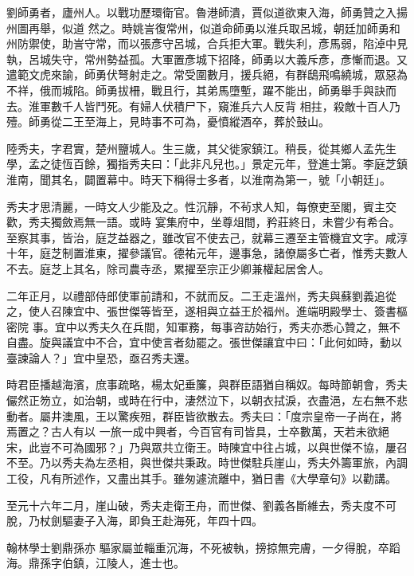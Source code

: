 \begin{pinyinscope}
 劉師勇者，廬州人。以戰功歷環衛官。魯港師潰，賈似道欲東入海，師勇贊之入揚州圖再舉，似道
 然之。時姚訔復常州，似道命師勇以淮兵取呂城，朝廷加師勇和州防禦使，助訔守常，而以張彥守呂城，合兵拒大軍。戰失利，彥馬弱，陷淖中見執，呂城失守，常州勢益孤。大軍置彥城下招降，師勇以大義斥彥，彥慚而退。又遣範文虎來諭，師勇伏弩射走之。常受圍數月，援兵絕，有群鴟飛鳴繞城，眾惡為不祥，俄而城陷。師勇拔柵，戰且行，其弟馬墮塹，躍不能出，師勇舉手與訣而去。淮軍數千人皆鬥死。有婦人伏積尸下，窺淮兵六人反背
 相拄，殺敵十百人乃殪。師勇從二王至海上，見時事不可為，憂憤縱酒卒，葬於鼓山。



 陸秀夫，字君實，楚州鹽城人。生三歲，其父徙家鎮江。稍長，從其鄉人孟先生學，孟之徒恆百餘，獨指秀夫曰：「此非凡兒也。」景定元年，登進士第。李庭芝鎮淮南，聞其名，闢置幕中。時天下稱得士多者，以淮南為第一，號「小朝廷」。



 秀夫才思清麗，一時文人少能及之。性沉靜，不茍求人知，每僚吏至閣，賓主交歡，秀夫獨斂焉無一語。或時
 宴集府中，坐尊俎間，矜莊終日，未嘗少有希合。至察其事，皆治，庭芝益器之，雖改官不使去己，就幕三遷至主管機宜文字。咸淳十年，庭芝制置淮東，擢參議官。德祐元年，邊事急，諸僚屬多亡者，惟秀夫數人不去。庭芝上其名，除司農寺丞，累擢至宗正少卿兼權起居舍人。



 二年正月，以禮部侍郎使軍前請和，不就而反。二王走溫州，秀夫與蘇劉義追從之，使人召陳宜中、張世傑等皆至，遂相與立益王於福州。進端明殿學士、簽書樞密院
 事。宜中以秀夫久在兵間，知軍務，每事咨訪始行，秀夫亦悉心贊之，無不自盡。旋與議宜中不合，宜中使言者劾罷之。張世傑讓宜中曰：「此何如時，動以臺諫論人？」宜中皇恐，亟召秀夫還。



 時君臣播越海濱，庶事疏略，楊太妃垂簾，與群臣語猶自稱奴。每時節朝會，秀夫儼然正笏立，如治朝，或時在行中，淒然泣下，以朝衣拭淚，衣盡浥，左右無不悲動者。屬井澳風，王以驚疾殂，群臣皆欲散去。秀夫曰：「度宗皇帝一子尚在，將焉置之？古人有以
 一旅一成中興者，今百官有司皆具，士卒數萬，天若未欲絕宋，此豈不可為國邪？」乃與眾共立衛王。時陳宜中往占城，以與世傑不協，屢召不至。乃以秀夫為左丞相，與世傑共秉政。時世傑駐兵崖山，秀夫外籌軍旅，內調工役，凡有所述作，又盡出其手。雖匆遽流離中，猶日書《大學章句》以勸講。



 至元十六年二月，崖山破，秀夫走衛王舟，而世傑、劉義各斷維去，秀夫度不可脫，乃杖劍驅妻子入海，即負王赴海死，年四十四。



 翰林學士劉鼎孫亦
 驅家屬並輜重沉海，不死被執，搒掠無完膚，一夕得脫，卒蹈海。鼎孫字伯鎮，江陵人，進士也。




\end{pinyinscope}
